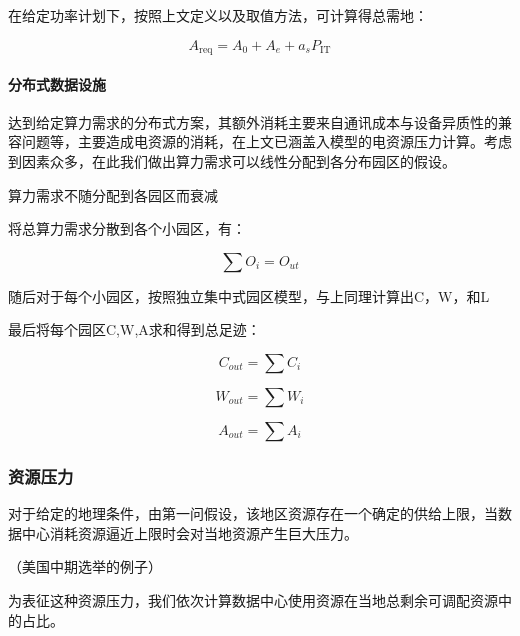 
在给定功率计划下，按照上文定义以及取值方法，可计算得总需地：

\begin{equation}\label{eq:q2-areq}
A_{\mathrm{req}}=A_{0}+A_{e}+a_sP_{\mathrm{IT}}
\end{equation}

\paragraph{分布式数据设施}\label{sec:q2-dis}

达到给定算力需求的分布式方案，其额外消耗主要来自通讯成本与设备异质性的兼容问题等，主要造成电资源的消耗，在上文已涵盖入模型的电资源压力计算。考虑到因素众多，在此我们做出算力需求可以线性分配到各分布园区的假设。

\begin{asum}\label{asum:no-decay}
算力需求不随分配到各园区而衰减
\end{asum}

将总算力需求分散到各个小园区，有：

\begin{equation}\label{eq:q2-sum-o}
\sum O_{i}=O_{ut}
\end{equation}

随后对于每个小园区，按照独立集中式园区模型，与上同理计算出C，W，和L

最后将每个园区C,W,A求和得到总足迹：

\begin{equation}\label{eq:q2-cout}
C_{out} = \sum C_i
\end{equation}

\begin{equation}\label{eq:q2-wout-sum}
W_{out} = \sum W_i
\end{equation}

\begin{equation}\label{eq:q2-aout}
A_{out} = \sum A_i
\end{equation}

\subsubsection{资源压力}\label{sec:q2-pressure}

对于给定的地理条件，由第一问假设，该地区资源存在一个确定的供给上限，当数据中心消耗资源逼近上限时会对当地资源产生巨大压力。

（美国中期选举的例子）

为表征这种资源压力，我们依次计算数据中心使用资源在当地总剩余可调配资源中的占比。

